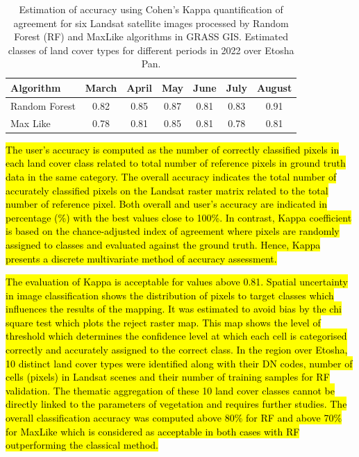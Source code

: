 \documentclass[climate,article,submit,pdftex,moreauthors]{Definitions/mdpi}
\begin{document}
\vspace{2em}
\begin{table}[H] 
\caption{Estimation of accuracy using Cohen's Kappa quantification of agreement for six Landsat satellite images processed by Random Forest (RF) and MaxLike algorithms in GRASS GIS. Estimated classes of land cover types for different periods in 2022 over Etosha Pan.\label{tabAcc}}
\begin{tabularx}{\textwidth}{p{3cm}CCCCCC}
\toprule
\textbf{Algorithm} & \textbf{March} & \textbf{April} & \textbf{May} & \textbf{June} & \textbf{July} & \textbf{August} \\
\midrule
 Random Forest & 0.82 & 0.85 & 0.87  & 0.81 & 0.83 & 0.91\\
Max Like &  0.78 & 0.81 & 0.85  & 0.81 & 0.78 & 0.81 \\
\bottomrule
\end{tabularx}
\end{table}

\hl{The user's accuracy is computed as the number of correctly classified pixels in each land cover class related to total number of reference pixels in ground truth data in the same category. The overall accuracy indicates the total number of accurately classified pixels on the Landsat raster matrix related to the total number of reference pixel. Both overall and user's accuracy are indicated in percentage (\%) with the best values close to 100\%. In contrast, Kappa coefficient is based on the chance-adjusted index of agreement where pixels are randomly assigned to classes and evaluated against the ground truth. Hence, Kappa presents a discrete multivariate method of accuracy assessment.} 

\hl{The evaluation of Kappa is acceptable for values above 0.81. Spatial uncertainty in image classification shows the distribution of pixels to target classes which influences the results of the mapping. It was estimated to avoid bias by the chi square test which plots the reject raster map. This map shows the level of threshold which determines the confidence level at which each cell is categorised correctly and accurately assigned to the correct class. In the region over Etosha, 10 distinct land cover types were identified along with their DN codes, number of cells (pixels) in Landsat scenes and their number of training samples for RF validation. The thematic aggregation of these 10 land cover classes cannot be directly linked to the parameters of vegetation and requires further studies. The overall classification accuracy was computed above 80\% for RF and above 70\% for MaxLike which is considered as acceptable in both cases with RF outperforming the classical method.}
\end{document}
